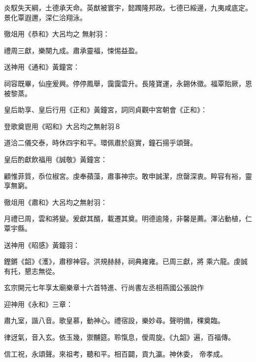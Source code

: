 \begin{pinyinscope}
 炎馭失天綱，土德承天命。英猷被寰宇，懿躅隆邦政。七德已綏邊，九夷咸底定。景化覃遐邇，深仁洽翔泳。



 徹俎用《恭和》大呂均之
 無射羽：



 禮周三獻，樂闋九成。肅承靈福，悚惕益盈。



 送神用《通和》黃鐘宮：



 祠容既畢，仙座爰興。停停鳳舉，靄靄雲升。長隆寶運，永錫休徵。福覃貽厥，恩被黎蒸。



 皇后助享、皇后行用《正和》黃鐘宮，詞同貞觀中宮朝會《正和》：



 登歌奠鬯用《昭和》大呂均之無射羽８



 道洽二儀交泰，時休四宇和平。環佩肅於庭實，鐘石揚乎頌聲。



 皇后酌獻飲福用《誠敬》黃鐘宮：



 顧惟菲質，忝位椒宮。虔奉蘋藻，肅事神宗。敢申誠潔，庶罄深衷。睟容有裕，靈享無窮。



 徹俎用《肅和》大呂均之無射羽：



 月禮已周，雲和將變。爰獻其醑，載遷其奠。明德逾隆，非馨是薦。澤沾動植，仁覃宇縣。



 送神用《昭感》黃鐘羽：



 鏗鏘《韶》《濩》，肅穆神容。洪規赫赫，祠典雍雍。已周三獻，將
 乘六龍。虔誠有托，懇志無從。



 玄宗開元七年享太廟樂章十六首特進、行尚書左丞相燕國公張說作



 迎神用《永和》三章：



 肅九室，諧八音。歌皇慕，動神心。禮宿設，樂妙尋。聲明備，稞奠臨。



 律迓氣，音入玄。依玉幾，禦黼筵。聆愾息，僾周旋。《九韶》遍，百福傳。



 信工祝，永頌聲。來祖考，聽和平。相百闢，貢九瀛。神休委，
 帝孝成。




\end{pinyinscope}
